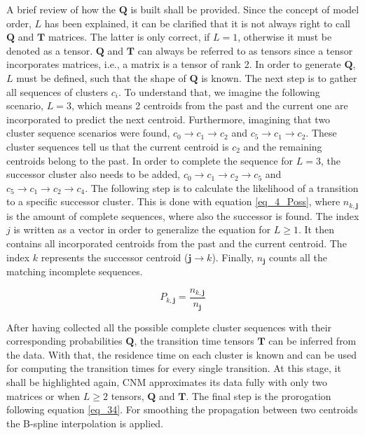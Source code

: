 A brief review of how the $\bm Q$ is built shall be provided. 
Since the concept of 
model order, $L$ has been explained, it can be clarified that
it is not always right to call $\bm Q$ and $\bm T$ matrices. 
The latter is only correct, if $L = 1$, otherwise it must be 
denoted as a tensor. $\bm Q$ and $\bm T$ can always be 
referred to as tensors since a tensor incorporates matrices, i.e., a matrix is a tensor of rank 2. 
In order to generate $\bm Q$, 
$L$ must be defined, such that the shape of $\bm Q$ is 
known. The next step is to gather all sequences of clusters 
$c_i$. To understand that, we imagine the following scenario, 
$L = 3$, which means 2 centroids from the past and the 
current one are 
incorporated to predict the next centroid.
Furthermore, imagining that two cluster sequence scenarios were found,
$c_0 \rightarrow c_1 \rightarrow c_2 $ and  $c_5 \rightarrow c_1 \rightarrow c_2 $. 
These cluster sequences tell us that the current centroid is $c_2$ and the remaining centroids belong to the past. 
In order to complete the sequence for $L = 3$, the successor cluster also needs 
to be added, $c_0 \rightarrow c_1 \rightarrow c_2 \rightarrow c_5 $ and $c_5 \rightarrow c_1 \rightarrow c_2 \rightarrow c_4$.
The following step is to calculate the likelihood 
of a transition to a specific successor cluster. This is done with equation \eqref{eq_4_Poss}, where $n_{k, \bm{j}}$
is the amount of complete sequences, where also the successor
is found. The index $j$ is written as a vector in order 
to generalize the equation for $L \ge 1$. It then contains 
all incorporated centroids from the past and the current centroid.
The index $k$ represents the successor centroid ($\bm{j} \rightarrow k$).
Finally, $n_{\bm{j}}$ counts all the matching incomplete sequences.

\begin{equation}
    \label{eq_4_Poss}
     P_{k, \bm j} = \frac{n_{k,\bm{j}}}{n_{\bm{j}}}
\end{equation}

After having collected all the possible complete cluster sequences with their corresponding probabilities $\bm Q$, the transition time tensors $\bm T$ can be inferred from the data.
With that, the residence time on each cluster is known and can be 
used for computing the transition times for every 
single transition. At this stage, it shall be highlighted again, 
CNM approximates its data fully with only two 
matrices or when $L \ge 2$ tensors, $\bm Q$ and $\bm T$. The 
final step is the prorogation following equation \eqref{eq_34}. 
For smoothing the propagation between two centroids the B-spline interpolation 
is applied.

